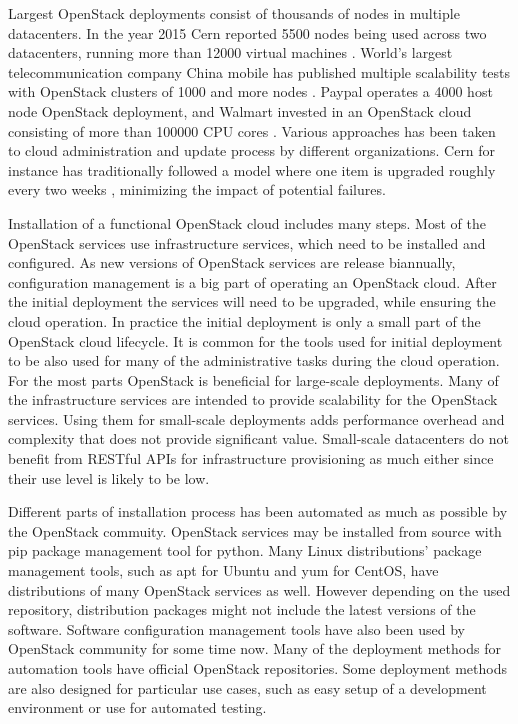 Largest OpenStack deployments consist of thousands of nodes in multiple
datacenters. In the year 2015 Cern reported 5500 nodes being used across two
datacenters, running more than 12000 virtual machines \cite{bell2015scaling}.
World's largest telecommunication company China mobile has published multiple
scalability tests with OpenStack clusters of 1000 and more nodes
\cite{china-mobile}. Paypal operates a 4000 host node OpenStack deployment, and
Walmart invested in an OpenStack cloud consisting of more than 100000 CPU cores
\cite{kanso2017enhancing}. Various approaches has been taken to cloud
administration and update process by different organizations. Cern for instance
has traditionally followed a model where one item is upgraded roughly every two
weeks \cite{bell2015scaling}, minimizing the impact of potential failures.

Installation of a functional OpenStack cloud includes many steps. Most of the
OpenStack services use infrastructure services, which need to be installed and
configured. As new versions of OpenStack services are release biannually,
configuration management is a big part of operating an OpenStack cloud. After
the initial deployment the services will need to be upgraded, while ensuring
the cloud operation. In practice the initial deployment is only a small part of
the OpenStack cloud lifecycle. It is common for the tools used for initial
deployment to be also used for many of the administrative tasks during the
cloud operation. For the most parts OpenStack is beneficial for large-scale
deployments. Many of the infrastructure services are intended to provide
scalability for the OpenStack services. Using them for small-scale deployments
adds performance overhead and complexity that does not provide significant
value. Small-scale datacenters do not benefit from RESTful APIs for
infrastructure provisioning as much either since their use level is likely to
be low.

Different parts of installation process has been automated as much as possible
by the OpenStack commuity. OpenStack services may be installed from source with
pip package management tool for python. Many Linux distributions' package
management tools, such as apt for Ubuntu and yum for CentOS, have distributions
of many OpenStack services as well. However depending on the used repository,
distribution packages might not include the latest versions of the software.
Software configuration management tools have also been used by OpenStack
community for some time now. Many of the deployment methods for automation
tools have official OpenStack repositories. Some deployment methods are also
designed for particular use cases, such as easy setup of a development
environment or use for automated testing.

